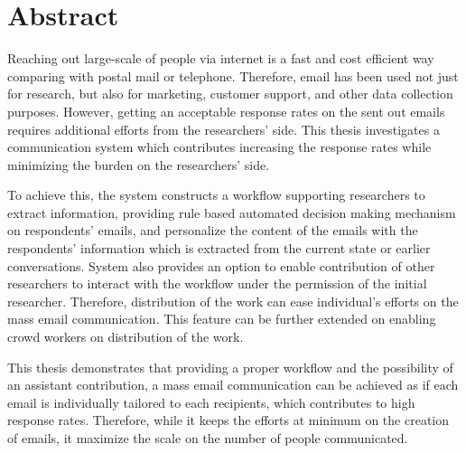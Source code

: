 
{}
{}	

\chapter*{Abstract}

Reaching out large-scale of people via internet is a fast and cost efficient way comparing with postal mail or telephone. Therefore, email has been used not just for research, but also for marketing, customer support, and other data collection purposes. However, getting an acceptable response rates on the sent out emails requires additional efforts from the researchers' side. This thesis investigates a communication system which contributes increasing the response rates while minimizing the burden on the researchers' side. 
\vspace{1cm}

To achieve this, the system constructs a workflow supporting researchers to extract information, providing rule based automated decision making mechanism on respondents' emails, and personalize the content of the emails with the respondents' information which is extracted from the current state or earlier conversations. System also provides an option to enable contribution of other researchers to interact with the workflow under the permission of the initial researcher. Therefore, distribution of the work can ease individual's efforts on the mass email communication. This feature can be further extended on enabling crowd workers on distribution of the work.
\vspace{1cm}

This thesis demonstrates that providing a proper workflow and the possibility of an assistant contribution, a mass email communication can be achieved as if each email is individually tailored to each recipients, which contributes to high response rates. Therefore, while it keeps the efforts at minimum on the creation of emails, it maximize the scale on the number of people communicated.
